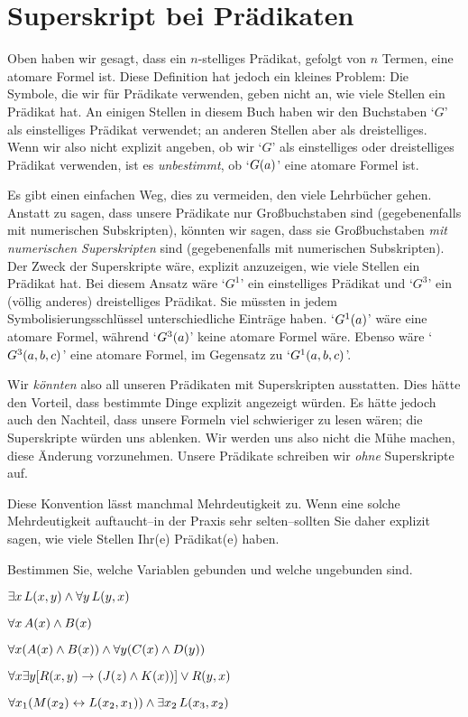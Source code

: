 \section{Superskript bei Prädikaten}
Oben haben wir gesagt, dass ein $n$-stelliges Prädikat, gefolgt von $n$ Termen, eine atomare Formel ist. Diese Definition hat jedoch ein kleines Problem: Die Symbole, die wir für Prädikate verwenden, geben nicht an, wie viele Stellen ein Prädikat hat. An einigen Stellen in diesem Buch haben wir den Buchstaben `$G$' als einstelliges Prädikat verwendet; an anderen Stellen aber als dreistelliges. Wenn wir also nicht explizit angeben, ob wir `$G$' als einstelliges oder dreistelliges Prädikat verwenden, ist es \emph{unbestimmt}, ob `$\mathord{G}(a)$' eine atomare Formel ist.

Es gibt einen einfachen Weg, dies zu vermeiden, den viele Lehrbücher gehen. Anstatt zu sagen, dass unsere Prädikate nur Gro{\ss}buchstaben sind (gegebenenfalls mit numerischen Subskripten), könnten wir sagen, dass sie Gro{\ss}buchstaben \emph{mit numerischen Superskripten} sind (gegebenenfalls mit numerischen Subskripten). Der Zweck der Superskripte wäre, explizit anzuzeigen, wie viele Stellen ein Prädikat hat. Bei diesem Ansatz wäre `$G^1$' ein einstelliges Prädikat und `$G^3$' ein (völlig anderes) dreistelliges Prädikat. Sie müssten in jedem Symbolisierungsschlüssel unterschiedliche Einträge haben. `$\mathord{G^1}(a)$' wäre eine atomare Formel, während `$\mathord{G^3}(a)$' keine atomare Formel wäre. Ebenso wäre `$\mathord{G^3}(a,b,c)$' eine atomare Formel, im Gegensatz zu `$\mathord{G^1}(a,b,c)$'. 

Wir \emph{könnten} also all unseren Prädikaten mit Superskripten ausstatten. Dies hätte den Vorteil, dass bestimmte Dinge explizit angezeigt würden. Es hätte jedoch auch den Nachteil, dass unsere Formeln viel schwieriger zu lesen wären; die Superskripte würden uns ablenken. Wir werden uns also nicht die Mühe machen, diese Änderung vorzunehmen. Unsere Prädikate schreiben wir \emph{ohne} Superskripte auf.

Diese Konvention lässt manchmal Mehrdeutigkeit zu. Wenn eine solche Mehrdeutigkeit auftaucht--in der Praxis sehr selten--sollten Sie daher explizit sagen, wie viele Stellen Ihr(e) Prädikat(e) haben. 

\practiceproblems
\problempart
\label{pr.freeFOL}
Bestimmen Sie, welche Variablen gebunden und welche ungebunden sind.
\begin{earg}
\item $\exists x\, \mathord{L}(x,y) \wedge \forall y\, \mathord{L}(y,x)$
\item $\forall x\, \mathord{A}(x) \wedge \mathord{B}(x)$
\item $\forall x (\mathord{A}(x) \wedge \mathord{B}(x)) \wedge \forall y(\mathord{C}(x) \wedge \mathord{D}(y))$
\item $\forall x\exists y[\mathord{R}(x,y) \rightarrow (\mathord{J}(z) \wedge \mathord{K}(x))] \vee \mathord{R}(y,x)$
\item $\forall x_1(\mathord{M}(x_2) \leftrightarrow \mathord{L}(x_2,x_1)) \wedge \exists x_2\,\mathord{L}(x_3,x_2)$
\end{earg}


